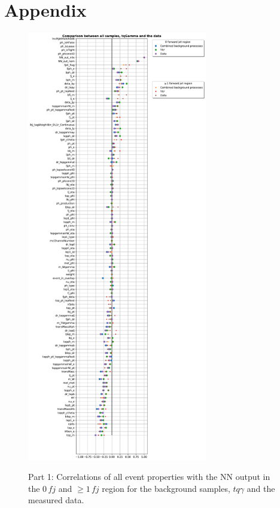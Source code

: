 \chapter{Appendix}
\begin{figure}[htbp]
    \centering
    \includegraphics[width=0.7\textwidth]{Plots/corrAll.pdf}
    \label{fig:corrAll}
    \caption{Part 1: Correlations of all event properties with the NN output in the $0\,fj$ and $\geq 1\,fj$ region for the background samples, $tq\gamma$ and the measured data.}
\end{figure}